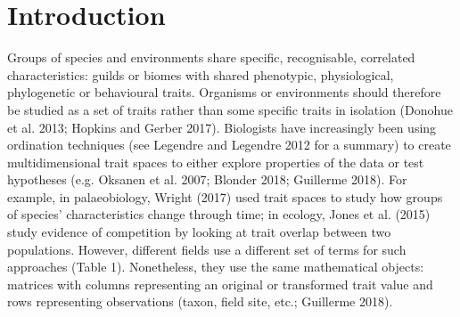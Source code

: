 \documentclass[]{article}
\begin{document}
\section{Introduction}\label{introduction}

Groups of species and environments share specific, recognisable,
correlated characteristics: guilds or biomes with shared phenotypic,
physiological, phylogenetic or behavioural traits. Organisms or
environments should therefore be studied as a set of traits rather than
some specific traits in isolation (Donohue et al. 2013; Hopkins and
Gerber 2017). Biologists have increasingly been using ordination
techniques (see Legendre and Legendre 2012 for a summary) to create
multidimensional trait spaces to either explore properties of the data
or test hypotheses (e.g. Oksanen et al. 2007; Blonder 2018; Guillerme
2018). For example, in palaeobiology, Wright (2017) used trait spaces to
study how groups of species' characteristics change through time; in
ecology, Jones et al. (2015) study evidence of competition by looking at
trait overlap between two populations. However, different fields use a
different set of terms for such approaches (Table 1). Nonetheless, they
use the same mathematical objects: matrices with columns representing an
original or transformed trait value and rows representing observations
(taxon, field site, etc.; Guillerme 2018).

\renewcommand\baselinestretch{1}\selectfont
\end{document}

